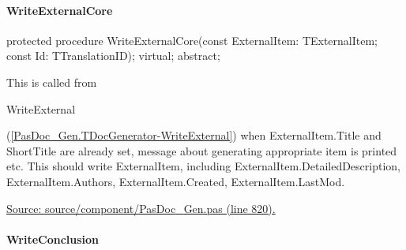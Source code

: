 \documentclass{report}
\newif\ifpdf
\begin{document}
\paragraph*{WriteExternalCore}\hspace*{\fill}

\label{PasDoc_Gen.TDocGenerator-WriteExternalCore}
\begin{list}{}{
\setlength{\itemindent}{0cm}
\setlength{\listparindent}{0cm}
\setlength{\leftmargin}{\evensidemargin}
\addtolength{\leftmargin}{\tmplength}
\settowidth{\labelsep}{X}
\addtolength{\leftmargin}{\labelsep}
\setlength{\labelwidth}{\tmplength}
}
\item[\textbf{Declaration}\hfill]
\ifpdf
\begin{flushleft}
\fi
\begin{ttfamily}
protected procedure WriteExternalCore(const ExternalItem: TExternalItem; const Id: TTranslationID); virtual; abstract;\end{ttfamily}

\ifpdf
\end{flushleft}
\fi

\par
\item[\textbf{Description}]
This is called from \begin{ttfamily}WriteExternal\end{ttfamily}(\ref{PasDoc_Gen.TDocGenerator-WriteExternal}) when ExternalItem.Title and ShortTitle are already set, message about generating appropriate item is printed etc. This should write ExternalItem, including ExternalItem.DetailedDescription, ExternalItem.Authors, ExternalItem.Created, ExternalItem.LastMod.\par
\href{https://github.com/pasdoc/pasdoc/blob/master/source/component/PasDoc_Gen.pas#L820}{Source: source/component/PasDoc{\_}Gen.pas (line 820).}

\end{list}
\paragraph*{WriteConclusion}\hspace*{\fill}
\end{document}
